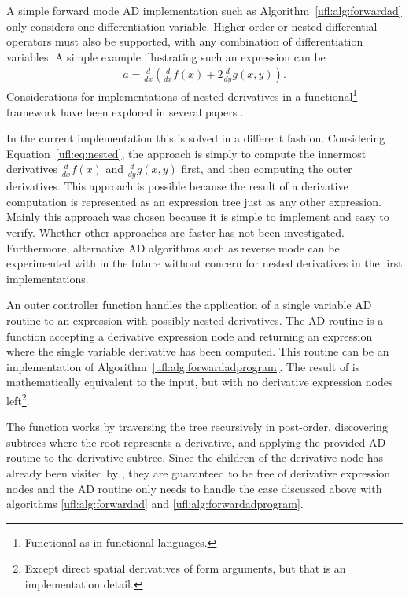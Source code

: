A simple forward mode AD implementation such as
Algorithm~\ref{ufl:alg:forwardad} only considers one differentiation
variable.  Higher order or nested differential operators must also be
supported, with any combination of differentiation variables.  A
simple example illustrating such an expression can be
\begin{align} \label{ufl:eq:nested}
a = \frac{d}{dx}\left( \frac{d}{dx} f(x) + 2 \frac{d}{dy} g(x,y) \right) .
\end{align}
Considerations for implementations of nested derivatives
in a functional\footnote{Functional as in functional languages.}
framework have been explored in several
papers \citep{Karczmarczuk2001,PearlmutterSiskind2007,SiskindPearlmutter2008}.

In the current \ufl{} implementation this is solved in a different
fashion.  Considering Equation~\eqref{ufl:eq:nested}, the approach is
simply to compute the innermost derivatives $\frac{d}{dx} f(x)$ and
$\frac{d}{dy} g(x,y)$ first, and then computing the outer derivatives.
This approach is possible because the result of a derivative
computation is represented as an expression tree just as any other
expression.  Mainly this approach was chosen because it is simple to
implement and easy to verify.  Whether other approaches are faster has
not been investigated.  Furthermore, alternative AD algorithms such as
reverse mode can be experimented with in the future without concern
for nested derivatives in the first implementations.

An outer controller function  handles the application
of a single variable AD routine to an expression with possibly nested
derivatives.  The AD routine is a function accepting a derivative
expression node and returning an expression where the single variable
derivative has been computed.  This routine can be an implementation
of Algorithm~\ref{ufl:alg:forwardadprogram}.  The result of
 is mathematically equivalent to the input, but with
no derivative expression nodes left\footnote{Except direct spatial
  derivatives of form arguments, but that is an implementation
  detail.}.

The function  works by traversing the tree
recursively in post-order, discovering subtrees where the root
represents a derivative, and applying the provided AD routine to the
derivative subtree.  Since the children of the derivative node has
already been visited by , they are guaranteed to be
free of derivative expression nodes and the AD routine only needs to
handle the case discussed above with algorithms
\ref{ufl:alg:forwardad} and \ref{ufl:alg:forwardadprogram}.


